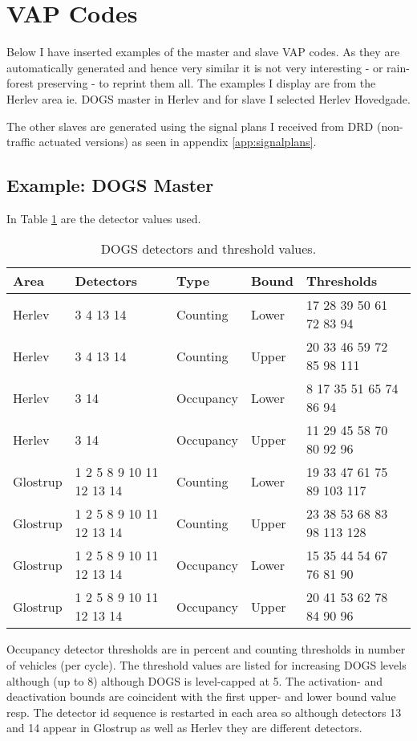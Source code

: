 \section{VAP Codes}
\label{app:vap}

Below I have inserted examples of the master and slave VAP codes. As they are automatically generated and hence very similar it is not very interesting - or rain-forest preserving - to reprint them all. The examples I display are from the Herlev area ie. DOGS master in Herlev and for slave I selected Herlev Hovedgade.

The other slaves are generated using the signal plans I received from DRD (non-traffic actuated versions) as seen in appendix \ref{app:signalplans}. 

\subsection{Example: DOGS Master}
In Table \ref{tab:thvals} are the detector values used.

\begin{table}[ht]
\centering
\begin{tabular}{l|l|l|l|l}
\textbf{Area} & \textbf{Detectors} & \textbf{Type} & \textbf{Bound} & \textbf{Thresholds}\\ \hline
Herlev & 3 4 13 14 & Counting & Lower & 17 28 39 50 61 72 83 94\\
Herlev & 3 4 13 14 & Counting & Upper & 20 33 46 59 72 85 98 111\\
Herlev & 3 14 & Occupancy & Lower & 8 17 35 51 65 74 86 94\\
Herlev & 3 14 & Occupancy & Upper & 11 29 45 58 70 80 92 96\\
Glostrup & 1 2 5 8 9 10 11 12 13 14 & Counting & Lower & 19 33 47 61 75 89 103 117\\
Glostrup & 1 2 5 8 9 10 11 12 13 14 & Counting & Upper & 23 38 53 68 83 98 113 128\\
Glostrup & 1 2 5 8 9 10 11 12 13 14 & Occupancy & Lower & 15 35 44 54 67 76 81 90\\
Glostrup & 1 2 5 8 9 10 11 12 13 14 & Occupancy & Upper & 20 41 53 62 78 84 90 96\\
\end{tabular}
\caption{DOGS detectors and threshold values.}
\label{tab:thvals}
\end{table}

Occupancy detector thresholds are in percent and counting thresholds in number of vehicles (per cycle). The threshold values are listed for increasing DOGS levels although (up to 8) although DOGS is level-capped at 5. The activation- and deactivation bounds are coincident with the first upper- and lower bound value resp. The detector id sequence is restarted in each area so although detectors 13 and 14 appear in Glostrup as well as Herlev they are different detectors.

